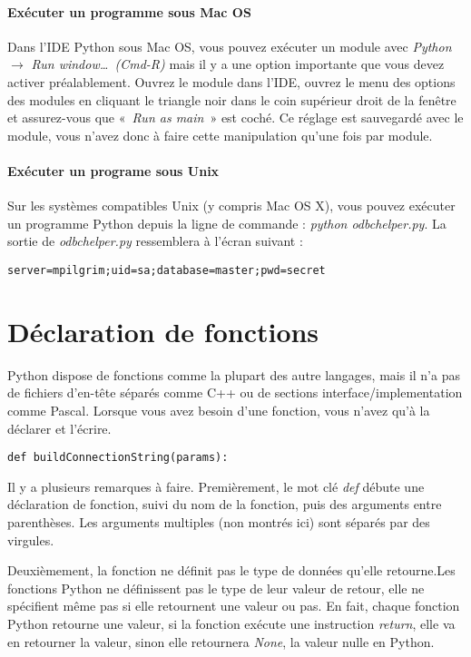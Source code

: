 \paragraph*{Exécuter un programme sous Mac OS}

Dans l'IDE Python sous Mac OS, vous pouvez exécuter un module avec \emph{Python}$\rightarrow$ \emph{Run window…~(Cmd-R)} mais il y a une option importante que vous devez activer préalablement. Ouvrez le module dans l'IDE, ouvrez le menu des options des modules en cliquant le triangle noir dans le coin supérieur droit de la fenêtre et assurez-vous que «~\emph{Run as main}~» est coché. Ce réglage est sauvegardé avec le module, vous n'avez donc à faire cette manipulation qu'une fois par module.

\paragraph*{Exécuter un programe sous Unix}

Sur les systèmes compatibles Unix (y compris Mac OS X), vous pouvez exécuter un programme Python depuis la ligne de commande : \emph{python odbchelper.py}. La sortie de \emph{odbchelper.py} ressemblera à l'écran suivant :

\begin{lstlisting}
server=mpilgrim;uid=sa;database=master;pwd=secret
\end{lstlisting}

\section{Déclaration de fonctions}

Python dispose de fonctions comme la plupart des autre langages, mais il n'a pas de fichiers d'en-tête séparés comme C++ ou de sections interface/implementation comme Pascal. Lorsque vous avez besoin d'une fonction, vous n'avez qu'à la déclarer et l'écrire.

\begin{lstlisting}
def buildConnectionString(params):
\end{lstlisting}

Il y a plusieurs remarques à faire. Premièrement, le mot clé \emph{def} débute une déclaration de fonction, suivi du nom de la fonction, puis des arguments entre parenthèses. Les arguments multiples (non montrés ici) sont séparés par des virgules.

Deuxièmement, la fonction ne définit pas le type de données qu'elle retourne.Les fonctions Python ne définissent pas le type de leur valeur de retour, elle ne spécifient même pas si elle retournent une valeur ou pas. En fait, chaque fonction Python retourne une valeur, si la fonction exécute une instruction \emph{return}, elle va en retourner la valeur, sinon elle retournera \emph{None}, la valeur nulle en Python.

